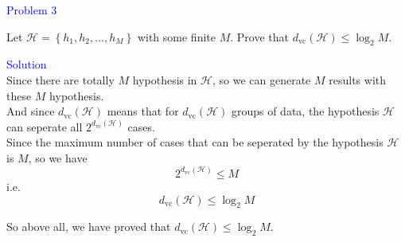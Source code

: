 \textcolor{blue}{Problem 3}

Let $\mathcal{H}=\left\{h_1, h_2, \ldots, h_M\right\}$ with some finite $M$. Prove that $d_{\mathrm{vc}}(\mathcal{H}) \leq \log _2 M$.

\textcolor{blue}{Solution}\\
Since there are totally $M$ hypothesis in $\mathcal{H}$, so we can generate $M$ results with these $M$ hypothesis.\\
And since $d_{\text{vc}}(\mathcal H)$ means that for $d_{\text{vc}}(\mathcal H)$ groups of data, the hypothesis $\mathcal{H}$ can seperate all $2^{d_{\text{vc}}(\mathcal H)}$ cases.\\
Since the maximum number of cases that can be seperated by the hypothesis $\mathcal{H}$ is $M$, so we have
$$2^{d_{\text{vc}}(\mathcal H)}\leq M$$
i.e.
$$d_{\text{vc}}(\mathcal H)\leq \log_2M$$

So above all, we have proved that $d_{\text{vc}}(\mathcal H)\leq \log_2M$.

\newpage